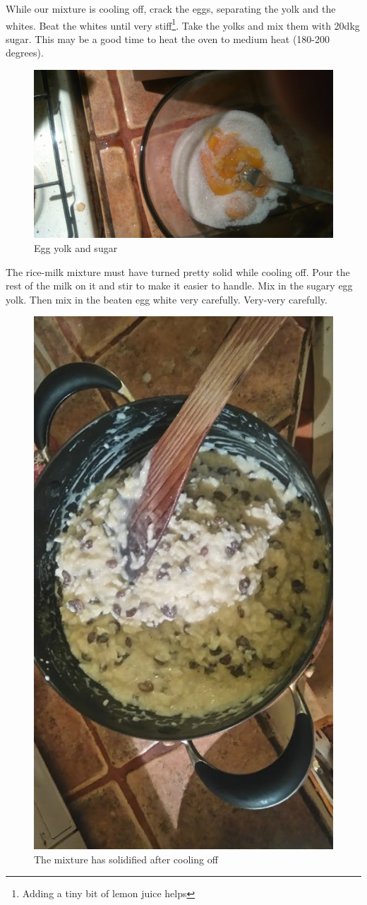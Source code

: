 \documentclass{article}
\begin{document}
While our mixture is cooling off, crack the eggs, separating the yolk and the whites. Beat the whites until very stiff\footnote{Adding a tiny bit of lemon juice helps}. Take the yolks and mix them with 20dkg sugar. This may be a good time to heat the oven to medium heat (180-200 degrees).

\begin{figure}[!htbp]
\includegraphics[width=\textwidth]{rizskoch_08}
\caption{Egg yolk and sugar}
\end{figure}

The rice-milk mixture must have turned pretty solid while cooling off. Pour the rest of the milk on it and stir to make it easier to handle. Mix in the sugary egg yolk. Then mix in the beaten egg white very carefully. Very-very carefully.

\begin{figure}[!htbp]
\centering
\includegraphics[height=\textwidth]{rizskoch_13}
\caption{The mixture has solidified after cooling off}
\end{figure}
\end{document}
